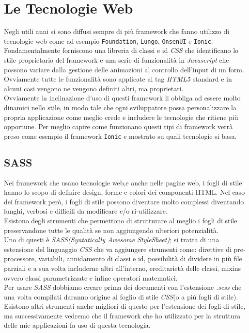 \section{Le Tecnologie Web}
Negli utili anni si sono diffusi sempre di più framework che fanno utilizzo di tecnologie web come ad esempio \texttt{Foundation}, \texttt{Lungo}, \texttt{OnsenUI} e \texttt{Ionic}. Fondamentalmente forniscono una libreria di classi e id \emph{CSS} che identificano lo stile proprietario del framework e una serie di funzionalità in \emph{Javascript} che possono variare dalla gestione delle animazioni al controllo dell'input di un form.
Ovviamente tutte le funzionalità sono applicate ai tag \emph{HTML5} standard e in alcuni casi vengono ne vengono definiti altri, ma proprietari.\\
Ovviamente la inclinazione d'uso di questi framework li obbliga ad essere molto dinamici nello stile, in modo tale che ogni sviluppatore possa personalizzare la propria applicazione come meglio crede e includere le tecnologie che ritiene più opportune. Per meglio capire come funzionano questi tipi di framework verrà preso come esempio il framework \texttt{Ionic} e mostrato su quali tecnologie si basa.
\subsection{SASS}
Nei framework che usano tecnologie web,e anche nelle pagine web, i fogli di stile hanno lo scopo di definire design, forme e colori dei componenti HTML. Nel caso dei framework però, i fogli di stile possono diventare molto complessi diventando lunghi, verbosi e difficili da modificare e/o ri-utilizzare.\\
Esistono degli strumenti che permettono di strutturare al meglio i fogli di stile preservandone tutte le qualità se non aggiungendo ulteriori potenzialità.\\
Uno di questi è \emph{SASS(Syntatically Awesome StyleSheet)}; si tratta di una estensione del linguaggio \emph{CSS} che va aggiungere strumenti come: direttive di pre-processore, variabili, annidamento di classi e id, possibilità di dividere in più file parziali e a sua volta includerne altri all'interno, ereditarietà delle classi, mixins ovvero classi parametrizzate e infine operatori matematici.\\
Per usare \emph{SASS} dobbiamo creare prima dei documenti con l'estensione \emph{.scss} che una volta compilati daranno origine al foglio di stile \emph{CSS}(o a più fogli di stile).
Esistono altri strumenti anche migliori di questo per l'estensione dei fogli di stile, ma successivamente vedremo che il framework che ho utilizzato per la struttura delle mie applicazioni fa uso di questa tecnologia. 
